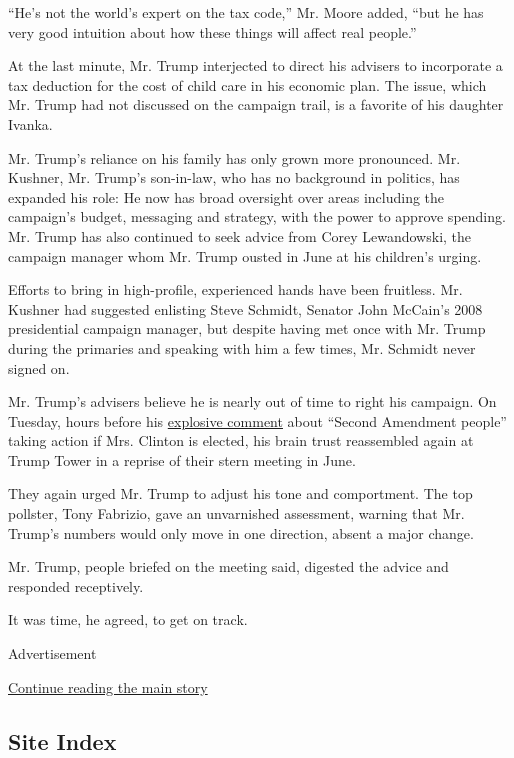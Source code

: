 ``He's not the world's expert on the tax code,'' Mr. Moore added, ``but
he has very good intuition about how these things will affect real
people.''

At the last minute, Mr. Trump interjected to direct his advisers to
incorporate a tax deduction for the cost of child care in his economic
plan. The issue, which Mr. Trump had not discussed on the campaign
trail, is a favorite of his daughter Ivanka.

Mr. Trump's reliance on his family has only grown more pronounced. Mr.
Kushner, Mr. Trump's son-in-law, who has no background in politics, has
expanded his role: He now has broad oversight over areas including the
campaign's budget, messaging and strategy, with the power to approve
spending. Mr. Trump has also continued to seek advice from Corey
Lewandowski, the campaign manager whom Mr. Trump ousted in June at his
children's urging.

Efforts to bring in high-profile, experienced hands have been fruitless.
Mr. Kushner had suggested enlisting Steve Schmidt, Senator John McCain's
2008 presidential campaign manager, but despite having met once with Mr.
Trump during the primaries and speaking with him a few times, Mr.
Schmidt never signed on.

Mr. Trump's advisers believe he is nearly out of time to right his
campaign. On Tuesday, hours before his
\href{http://www.nytimes3xbfgragh.onion/2016/08/10/us/politics/donald-trump-hillary-clinton.html?action=click\&contentCollection=Politics\&module=RelatedCoverage\&region=Marginalia\&pgtype=article}{explosive
comment} about ``Second Amendment people'' taking action if Mrs. Clinton
is elected, his brain trust reassembled again at Trump Tower in a
reprise of their stern meeting in June.

They again urged Mr. Trump to adjust his tone and comportment. The top
pollster, Tony Fabrizio, gave an unvarnished assessment, warning that
Mr. Trump's numbers would only move in one direction, absent a major
change.

Mr. Trump, people briefed on the meeting said, digested the advice and
responded receptively.

It was time, he agreed, to get on track.

Advertisement

\protect\hyperlink{after-bottom}{Continue reading the main story}

\hypertarget{site-index}{%
\subsection{Site Index}\label{site-index}}

